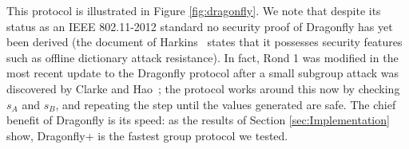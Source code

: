 This protocol is illustrated in Figure \ref{fig:dragonfly}.  We note that despite its status as an IEEE 802.11-2012 standard no security
proof of Dragonfly has yet been derived (the document of Harkins~\cite{Ha15} states that it possesses security features such as offline
dictionary attack resistance).  In fact, Rond 1 was modified in the most recent update      %
to the Dragonfly protocol after a small subgroup attack was discovered by Clarke and Hao~\cite{Ha2014}; the protocol works around this
now by checking $s_A$ and $s_B$, and repeating the step until the values generated are safe. The chief benefit of Dragonfly is its speed:
as the results of Section \ref{sec:Implementation} show, Dragonfly+ is the fastest group protocol we tested.

